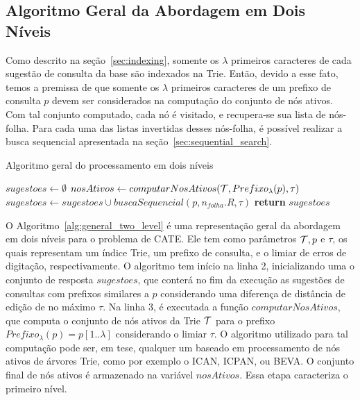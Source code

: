 \subsection{Algoritmo Geral da Abordagem em Dois Níveis}
\label{sec:general_two_level_algorithm}
Como descrito na seção~\ref{sec:indexing}, somente os $\lambda$ primeiros caracteres de cada sugestão de consulta da base são indexados na Trie. Então, devido a esse fato, temos a premissa de que somente os $\lambda$ primeiros caracteres de um prefixo de consulta $p$ devem ser considerados na computação do conjunto de nós ativos. Com tal conjunto computado, cada nó é visitado, e recupera-se sua lista de nós-folha. Para cada uma das listas invertidas desses nós-folha, é possível realizar a busca sequencial apresentada na seção~\ref{sec:sequential_search}. 

\begin{algorithm}[H]
\caption{Algoritmo geral do processamento em dois níveis}\label{alg:general_two_level}
\begin{algorithmic}[1]
    \State $sugestoes \leftarrow \emptyset$
    \State $nosAtivos \leftarrow computarNosAtivos(\mathcal{T}, Prefixo_{\lambda}(p), \tau)$ 
     
            \State $sugestoes \leftarrow sugestoes \cup buscaSequencial(p, n_{folha}.R, \tau)$
        \EndFor
    \EndFor
    \State \textbf{return} $sugestoes$
\EndFunction
\end{algorithmic}
\end{algorithm}

O Algoritmo~\ref{alg:general_two_level} é uma representação geral da abordagem em dois níveis para o problema de CATE. Ele tem como parâmetros $\mathcal{T}, p$ e $\tau$, os quais representam um índice Trie, um prefixo de consulta, e o limiar de erros de digitação, respectivamente. O algoritmo tem início na linha 2, inicializando uma o conjunto de resposta $sugestoes$, que conterá no fim da execução as sugestões de consultas com prefixos similares a $p$ considerando uma diferença de distância de edição de no máximo $\tau$. Na linha 3, é executada a função $computarNosAtivos$, que computa o conjunto de nós ativos da Trie $\mathcal{T}$ para o prefixo $Prefixo_{\lambda}(p) = p[1..\lambda]$ considerando o limiar $\tau$. O algoritmo utilizado para tal computação pode ser, em tese, qualquer um baseado em processamento de nós ativos de árvores Trie, como por exemplo o ICAN, ICPAN, ou BEVA. O conjunto final de nós ativos é armazenado na variável $nosAtivos$. Essa etapa caracteriza o primeiro nível. 

